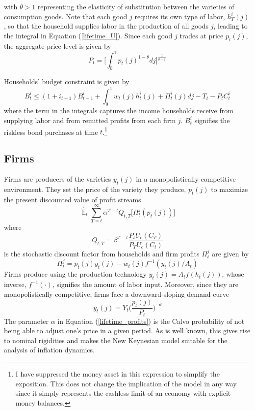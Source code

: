 \documentclass[11pt]{article}
\renewcommand{\[}{\begin{equation}}
\renewcommand{\]}{\end{equation}}
\DeclareMathOperator{\E}{\mathbb{E}}
\begin{document}
with $\theta>1$ representing the elasticity of substitution between the varieties of consumption goods. Note that each good $j$ requires its own type of labor, $h^i_T(j)$, so that the household supplies labor in the production of all goods $j$, leading to the integral in Equation (\ref{lifetime_U}). Since each good $j$ trades at price $p_t(j)$, the aggregate price level is given by
\begin{equation}
P_t =  \bigg[  \int_0^1 p_t(j)^{1-\theta} dj \bigg]^{\frac{1}{\theta-1}}
\label{agg_price}
\end{equation}

Households' budget constraint is given by
\begin{equation}
 B^i_t \leq (1+i_{t-1})B^i_{t-1} + \int_0^1 w_t(j)h^i_t(j) + \Pi_t^i(j)  dj-T_t -P_tC^i_t
 \label{BC}
\end{equation}
where the term in the integrals captures the income households receive from supplying labor and from remitted profits from each firm $j$. $B^i_t$ signifies the riskless bond purchases at time $t$.\footnote{I have suppressed the money asset in this expression to simplify the exposition. This does not change the implication of the model in any way since it simply represents the cashless limit of an economy with explicit money balances.}

\subsection{Firms}
Firms are producers of the varieties $y_t(j)$ in a monopolistically competitive environment. They set the price of the variety they produce, $p_t(j)$ to maximize the present discounted value of profit streams
\begin{equation}
\hat{\E}_t\sum^{\infty}_{T=t}\alpha^{T-t} Q_{t,T} \bigg[ \Pi^j_t(p_t(j))\bigg]
\label{lifetime_profits}
\end{equation}
where 
\begin{equation}
Q_{t,T} = \beta^{T-t} \frac{P_t U_c(C_T)}{P_T U_c(C_t)}
\end{equation}
is the stochastic discount factor from households and firm profits $\Pi_t^j$ are given by
\begin{equation}
\Pi_t^j = p_t(j)y_t(j) -w_t(j)f^{-1}(y_t(j)/A_t)
\end{equation}
Firms produce using the production technology $y_t(j)=A_tf(h_t(j))$, whose inverse, $f^{-1}(\cdot)$, signifies the amount of labor input. Moreover, since they are monopolistically competitive, firms face a downward-sloping demand curve
\begin{equation}
y_t(j) = Y_t \bigg(\frac{p_t(j)}{P_t}\bigg)^{-\theta}
\end{equation}
The parameter $\alpha$ in Equation (\ref{lifetime_profits}) is the Calvo probability of not being able to adjust one's price in a given period. As is well known, this gives rise to nominal rigidities and makes the New Keynesian model suitable for the analysis of inflation dynamics. 
\end{document}
